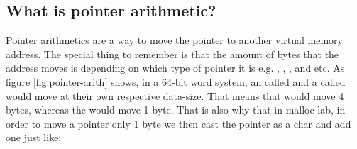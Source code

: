 \subsection{What is pointer arithmetic?}
Pointer arithmetics are a way to move the pointer to another virtual memory address. The special thing to remember is that the amount of bytes 
that the address moves is depending on which type of pointer it is e.g. , , , and etc.
As figure \ref{fig:pointer-arith} shows, in a 64-bit word system, an  called  and a  called  would move at their own respective data-size.
That means that  would move 4 bytes, whereas the  would move 1 byte.
That is also why that in malloc lab, in order to move a pointer only 1 byte we then cast the pointer as a char and add one just like: 
\begin{figure}[h]
    \centering
\end{figure}